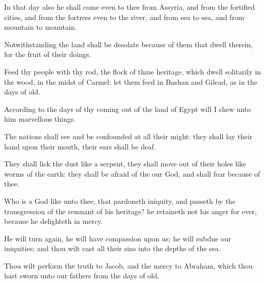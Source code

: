 \Verse In that day also he shall come even to thee from Assyria, and from the fortified cities, and from the fortress even to the river, and from sea to sea, and from mountain to mountain.

\Verse Notwithstanding the land shall be desolate because of them that dwell therein, for the fruit of their doings.

\Verse Feed thy people with thy rod, the flock of thine heritage, which dwell solitarily in the wood, in the midst of Carmel: let them feed in Bashan and Gilead, as in the days of old.

\Verse According to the days of thy coming out of the land of Egypt will I shew unto him marvellous things.

\Verse The nations shall see and be confounded at all their might: they shall lay their hand upon their mouth, their ears shall be deaf.

\Verse They shall lick the dust like a serpent, they shall move out of their holes like worms of the earth: they shall be afraid of the \LORD our God, and shall fear because of thee.

\Verse Who is a God like unto thee, that pardoneth iniquity, and passeth by the transgression of the remnant of his heritage? he retaineth not his anger for ever, because he delighteth in mercy.

\Verse He will turn again, he will have compassion upon us; he will subdue our iniquities; and thou wilt cast all their sins into the depths of the sea.

\Verse Thou wilt perform the truth to Jacob, and the mercy to Abraham, which thou hast sworn unto our fathers from the days of old.

